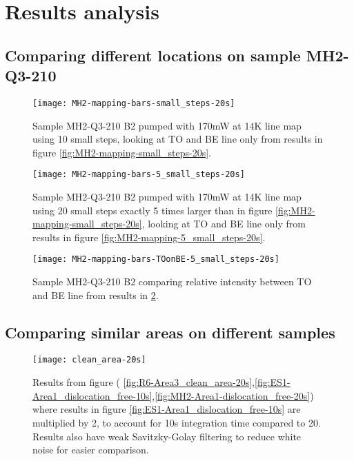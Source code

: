 \section{Results analysis}

\subsection{Comparing different locations on sample MH2-Q3-210}

\begin{figure}[H]
\centering
\texttt{[image: MH2-mapping-bars-small\_steps-20s]}
\caption[MH2-Q3-210 line mapping]{Sample MH2-Q3-210 B2 pumped with 170mW at 14K line map using 10 small steps, looking at TO and BE line only from results in figure \ref{fig:MH2-mapping-small_steps-20s}.}
\label{fig:MH2-mapping-bars-small_steps-20s}%
\end{figure}

\begin{figure}[H]
\centering
\texttt{[image: MH2-mapping-bars-5\_small\_steps-20s]}
\caption[MH2-Q3-210 line mapping]{Sample MH2-Q3-210 B2 pumped with 170mW at 14K line map using 20 small steps exactly 5 times larger than in figure \ref{fig:MH2-mapping-small_steps-20s}, looking at TO and BE line only from results in figure \ref{fig:MH2-mapping-5_small_steps-20s}.}
\label{fig:MH2-mapping-bars-5_small_steps-20s}%
\end{figure}


\begin{figure}[H]
\centering
\texttt{[image: MH2-mapping-bars-TOonBE-5\_small\_steps-20s]}
\caption[MH2-Q3-210 line mapping]{Sample MH2-Q3-210 B2 comparing relative intensity between TO and BE line from results in \ref{fig:MH2-mapping-bars-5_small_steps-20s}.}
\label{fig:MH2-mapping-bars-TOonBE-5_small_steps-20s}%
\end{figure}

\subsection{Comparing similar areas on different samples}


\begin{figure}[H]
\centering
\texttt{[image: clean\_area-20s]}
\caption[Comparisons in a clean area]{Results from figure ( \ref{fig:R6-Area3_clean_area-20s},\ref{fig:ES1-Area1_dislocation_free-10s},\ref{fig:MH2-Area1-dislocation_free-20s}) where results in figure \ref{fig:ES1-Area1_dislocation_free-10s} are multiplied by 2, to account for 10s integration time compared to 20. Results also have weak Savitzky-Golay filtering to reduce white noise for easier comparison.}
\label{fig:clean_area-20s_comparison}%
\end{figure}


